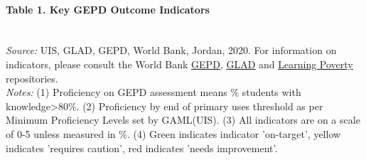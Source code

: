 \documentclass[
  twocolumn]{article}
\begin{document}
\vfill

\setlength\dashlinedash{0.2pt}
\setlength\dashlinegap{1.5pt}
\setlength\arrayrulewidth{0.3pt}

\hypertarget{table-1.-key-gepd-outcome-indicators}{%
\paragraph{Table 1. Key GEPD Outcome
Indicators}\label{table-1.-key-gepd-outcome-indicators}}

\begin{table}[H]
\\
\color{darkgray}\scriptsize{\textit{Source:} UIS, GLAD, GEPD, World Bank, Jordan, 2020. For information on indicators, please consult the World Bank \href{https://github.com/worldbank/GEPD}{\underline{GEPD}}, \href{https://github.com/worldbank/GLAD}{\underline{GLAD}} and \href{https://github.com/worldbank/LearningPoverty}{\underline{Learning Poverty}} repositories.}\\
\color{darkgray}\scriptsize{\textit{Notes:} (1) Proficiency on GEPD assessment means \% students with knowledge\textgreater{80\%}. (2) Proficiency by end of primary uses threshold as per Minimum Proficiency Levels set by GAML(UIS). (3) All indicators are on a scale of 0-5 unless measured in \%. (4) Green indicates indicator 'on-target', yellow indicates 'requires caution', red indicates 'needs improvement'.}
\end{table}
\raggedbottom
\end{document}
